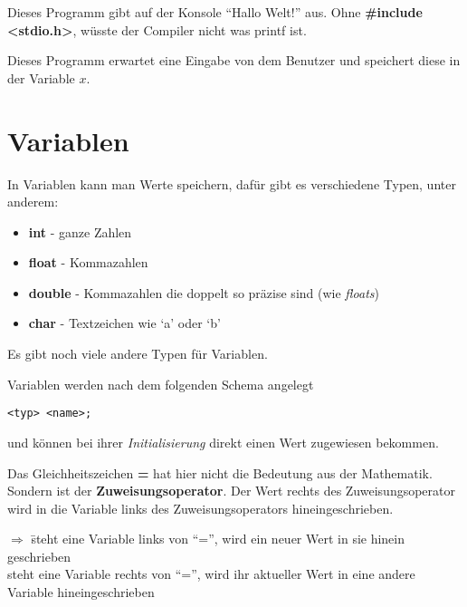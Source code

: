 \documentclass[c_worksheet.tex]{subfiles}
\begin{document}
Dieses Programm gibt auf der Konsole ``Hallo Welt!'' aus. Ohne \textbf{\#include <stdio.h>}, wüsste der Compiler nicht was printf ist.



Dieses Programm erwartet eine Eingabe von dem Benutzer und speichert diese in der Variable \(x\). 

\section{Variablen}

In Variablen kann man Werte speichern, dafür gibt es verschiedene Typen, unter anderem:

\begin{itemize}
 	\item \textbf{int} - ganze Zahlen
 	\item \textbf{float} - Kommazahlen
 	\item \textbf{double} - Kommazahlen die doppelt so präzise sind (wie \emph{floats})
 	\item \textbf{char} - Textzeichen wie `a' oder `b' 
 \end{itemize} 

Es gibt noch viele andere Typen für Variablen.

Variablen werden nach dem folgenden Schema angelegt

\begin{lstlisting}[numbers=none]
<typ> <name>;
\end{lstlisting}

und können bei ihrer \emph{Initialisierung} direkt einen Wert zugewiesen bekommen.



Das Gleichheitszeichen \textbf{=} hat hier nicht die Bedeutung aus der Mathematik. Sondern ist der \textbf{Zuweisungsoperator}. Der Wert rechts des Zuweisungsoperator wird in die Variable links des Zuweisungsoperators hineingeschrieben.\\
\begin{tabbing}
$\Rightarrow$ \=steht eine Variable links von ``='', wird ein neuer Wert in sie hinein geschrieben\\
\>steht eine Variable rechts von ``='', wird ihr aktueller Wert in eine andere Variable hineingeschrieben\\
\end{tabbing}
\end{document}
